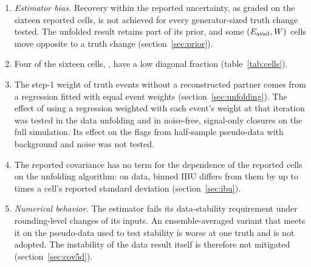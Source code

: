 \begin{enumerate}
\item \emph{Estimator bias.} Recovery within the reported uncertainty, as graded on the sixteen reported cells, is not achieved for every generator-sized truth change tested. The unfolded result retains part of its prior, and some $(E_{\mathrm{avail}},W)$ cells move opposite to a truth change (section~\ref{sec:prior}).
\item Four of the sixteen cells, , have a low diagonal fraction (table~\ref{tab:cells}).
\item The step-1 weight of truth events without a reconstructed partner comes from a regression fitted with equal event weights (section~\ref{sec:unfolding}). The effect of using a regression weighted with each event's weight at that iteration was tested in the data unfolding and in noise-free, signal-only closures on the full simulation. Its effect on the flags from half-sample pseudo-data with background and noise was not tested. %
\item The reported covariance has no term for the dependence of the reported cells on the unfolding algorithm: on data, binned IBU differs from them by up to  times a cell's reported standard deviation (section~\ref{sec:ibu}).
\item \emph{Numerical behavior.} The estimator fails its data-stability requirement under rounding-level changes of its inputs. An ensemble-averaged variant that meets it on the pseudo-data used to test stability is worse at one truth and is not adopted. The instability of the data result itself is therefore not mitigated (section~\ref{sec:cov5d}).

\end{enumerate}

